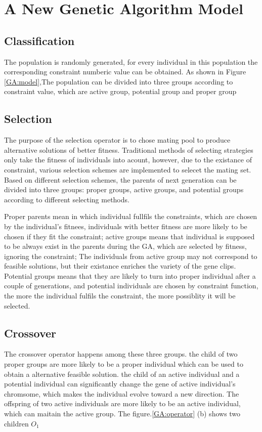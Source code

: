 \section{A New Genetic Algorithm Model}


\subsection{Classification}
The population is randomly generated, for every individual in this population
the corresponding constraint numberic value can be obtained. As shown in
Figure \ref{GA:model},The population can
be divided into three groups according to constraint value, which are active
group, potential group and proper group

\subsection{Selection}
The purpose of the selection operator is to chose mating pool to produce
alternative solutions of better fitness. Traditional methods of selecting
strategies only take the fitness of individuals into acount, however, due to 
the existance of constraint, various selection schemes are implemented to
selecet the mating set. Based on different selection schemes, the parents of
next generation can be divided into  three groups: proper groups, active groups,
and potential groups according to different selecting methods. 

Proper parents mean in which individual fullfils the constraints, which are
chosen by the individual's fitnees, individuals with better fitness are more
likely to be chosen if they fit the constraint; active groups means that
individual is supposed to be always exist in the parents during the GA, which
are selected by fitness, ignoring the constraint; The individuals from active
group may not correspond to feasible solutions, but their existance enriches the
variety of the gene clips.  Potential groups means that they are likely to turn
into proper individual after a couple of generations, and potential individuals
are chosen by constraint function, the more the individual fulfils the
constraint, the more possiblity it will be selected.

\subsection{Crossover}
The crossover operator happens among these three groups. the child of two proper
groups are more likely to be a proper individual which can be used to obtain a
alternative feasible solution. the child of an active individual and a potential
individual can significantly change the gene of active individual's chromsome,
which makes the individual evolve toward a new direction. The offspring of two
active individuals are more likely to be an active individual, which can maitain
the active group.  The figure.\ref{GA:operator} (b) shows two children $O_1$

